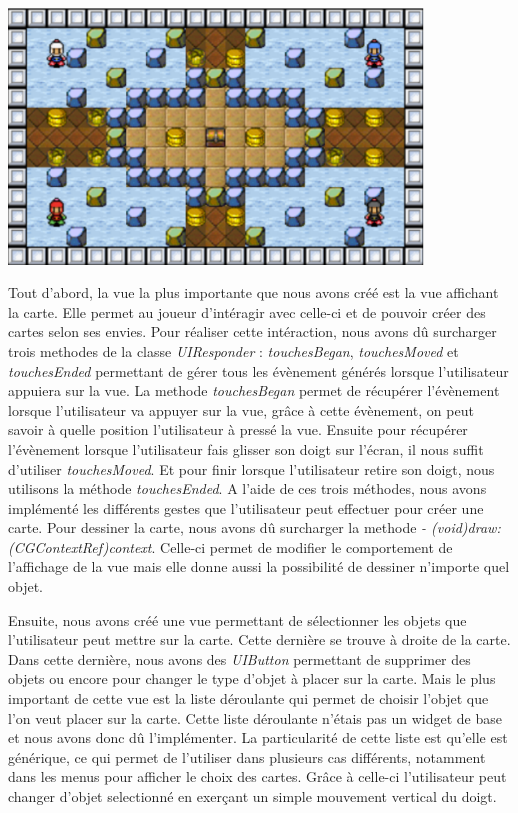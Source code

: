 {		\begin{center}
			\includegraphics[width=11cm]{./Developpement/Img/carte.eps}
		\end{center}
		Tout d'abord, la vue la plus importante que nous avons créé est la vue affichant la carte. Elle permet au joueur d'intéragir avec celle-ci et de pouvoir créer des cartes selon ses envies. Pour réaliser cette intéraction, nous avons dû surcharger trois methodes de la classe \textit{UIResponder} : \textit{touchesBegan}, \textit{touchesMoved} et \textit{touchesEnded} permettant de gérer tous les évènement générés lorsque l'utilisateur appuiera sur la vue. La methode \textit{touchesBegan} permet de récupérer l'évènement lorsque l'utilisateur va appuyer sur la vue, grâce à cette évènement, on peut savoir à quelle position l'utilisateur à pressé la vue. Ensuite pour récupérer l'évènement lorsque l'utilisateur fais glisser son doigt sur l'écran, il nous suffit d'utiliser \textit{touchesMoved}. Et pour finir lorsque l'utilisateur retire son doigt, nous utilisons la méthode \textit{touchesEnded}. A l'aide de ces trois méthodes, nous avons implémenté les différents gestes que l'utilisateur peut effectuer pour créer une carte. Pour dessiner la carte, nous avons dû surcharger la methode \textit{- (void)draw:(CGContextRef)context}. Celle-ci permet de modifier le comportement de l'affichage de la vue mais elle donne aussi la possibilité de dessiner n'importe quel objet.
		
		\begin{center}
		\end{center}
			
		Ensuite, nous avons créé une vue permettant de sélectionner les objets que l'utilisateur peut mettre sur la carte. Cette dernière se trouve à droite de la carte. Dans cette dernière, nous avons des \textit{UIButton} permettant de supprimer des objets ou encore pour changer le type d'objet à placer sur la carte. Mais le plus important de cette vue est la liste déroulante qui permet de choisir l'objet que l'on veut placer sur la carte. Cette liste déroulante n'étais pas un \gls{widget} de base et nous avons donc dû l'implémenter. La particularité de cette liste est qu'elle est générique, ce qui permet de l'utiliser dans plusieurs cas différents, notamment dans les menus pour afficher le choix des cartes. Grâce à celle-ci l'utilisateur peut changer d'objet selectionné en exerçant un simple mouvement vertical du doigt.
			
}
